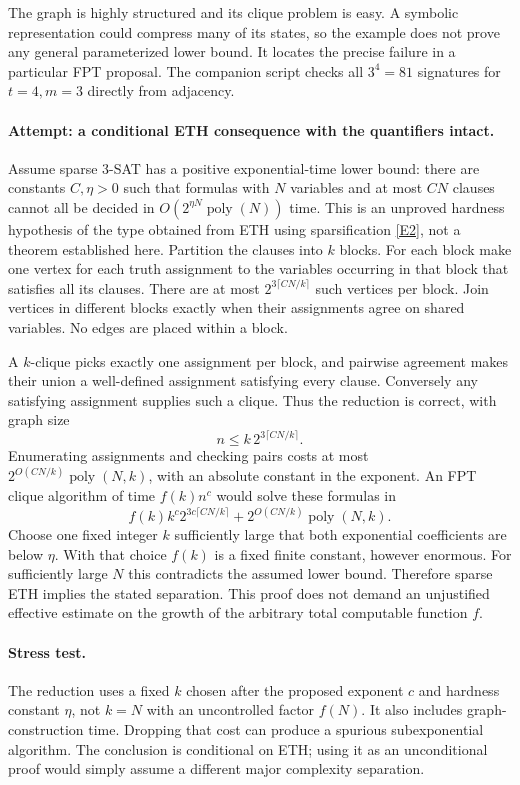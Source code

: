 \documentclass[11pt,a4paper]{article}
\numberwithin{equation}{section}
\newcommand{\eref}[2]{\hyperlink{extra:#1:#2}{[E#2]}}
\begin{document}
The graph is highly structured and its clique problem is easy. A symbolic
representation could compress many of its states, so the example does
not prove any general parameterized lower bound. It locates the precise
failure in a particular FPT proposal. The companion script checks all
$3^4=81$ signatures for $t=4,m=3$ directly from adjacency.

\paragraph{Attempt: a conditional ETH consequence with the quantifiers intact.}
Assume sparse 3-SAT has a positive exponential-time lower bound: there are
constants $C,\eta>0$ such that formulas with $N$ variables and at most
$CN$ clauses cannot all be decided in $O(2^{\eta N}\operatorname{poly}(N))$
time. This is an unproved hardness hypothesis of the type obtained from
ETH using sparsification \eref{76}{2}, not a theorem established here.
Partition the clauses into $k$ blocks. For each block make one vertex for
each truth assignment to the variables occurring in that block that
satisfies all its clauses. There are at most
$2^{3\lceil CN/k\rceil}$ such vertices per block. Join vertices in
different blocks exactly when their assignments agree on shared variables.
No edges are placed within a block.

A $k$-clique picks exactly one assignment per block, and pairwise agreement
makes their union a well-defined assignment satisfying every clause.
Conversely any satisfying assignment supplies such a clique. Thus the
reduction is correct, with graph size
\[
 n\leq k\,2^{3\lceil CN/k\rceil}.
\]
Enumerating assignments and checking pairs costs at most
$2^{O(CN/k)}\operatorname{poly}(N,k)$, with an absolute constant in the
exponent. An FPT clique algorithm of time $f(k)n^c$ would solve these
formulas in
\[
 f(k)k^c2^{3c\lceil CN/k\rceil}
       +2^{O(CN/k)}\operatorname{poly}(N,k).
\]
Choose one fixed integer $k$ sufficiently large that both exponential
coefficients are below $\eta$. With that choice $f(k)$ is a fixed finite
constant, however enormous. For sufficiently large $N$ this contradicts
the assumed lower bound. Therefore sparse ETH implies the stated
separation. This proof does not demand an unjustified effective estimate
on the growth of the arbitrary total computable function $f$.

\paragraph{Stress test.}
The reduction uses a fixed $k$ chosen after the proposed exponent $c$ and
hardness constant $\eta$, not $k=N$ with an uncontrolled factor $f(N)$.
It also includes graph-construction time. Dropping that cost can produce
a spurious subexponential algorithm. The conclusion is conditional on ETH;
using it as an unconditional proof would simply assume a different major
complexity separation.
\end{document}
